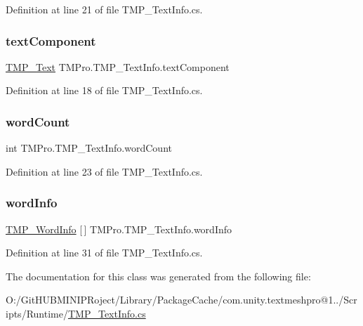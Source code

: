 Definition at line 21 of file T\+M\+P\+\_\+\+Text\+Info.\+cs.

\mbox{\label{class_t_m_pro_1_1_t_m_p___text_info_ab23d67636c516cc8bd985f7e0904d3d9}} 
\subsubsection{\texorpdfstring{textComponent}{textComponent}}
{\footnotesize\ttfamily \mbox{\hyperlink{class_t_m_pro_1_1_t_m_p___text}{T\+M\+P\+\_\+\+Text}} T\+M\+Pro.\+T\+M\+P\+\_\+\+Text\+Info.\+text\+Component}



Definition at line 18 of file T\+M\+P\+\_\+\+Text\+Info.\+cs.

\mbox{\label{class_t_m_pro_1_1_t_m_p___text_info_ac2bb20330e0efa71d8fecd90c783fe65}} 
\subsubsection{\texorpdfstring{wordCount}{wordCount}}
{\footnotesize\ttfamily int T\+M\+Pro.\+T\+M\+P\+\_\+\+Text\+Info.\+word\+Count}



Definition at line 23 of file T\+M\+P\+\_\+\+Text\+Info.\+cs.

\mbox{\label{class_t_m_pro_1_1_t_m_p___text_info_a5d98e3b54820b5c1368b8e9ee8205f5c}} 
\subsubsection{\texorpdfstring{wordInfo}{wordInfo}}
{\footnotesize\ttfamily \mbox{\hyperlink{struct_t_m_pro_1_1_t_m_p___word_info}{T\+M\+P\+\_\+\+Word\+Info}} \mbox{[}$\,$\mbox{]} T\+M\+Pro.\+T\+M\+P\+\_\+\+Text\+Info.\+word\+Info}



Definition at line 31 of file T\+M\+P\+\_\+\+Text\+Info.\+cs.



The documentation for this class was generated from the following file\+:\begin{DoxyCompactItemize}
\item 
O\+:/\+Git\+H\+U\+B\+M\+I\+N\+I\+P\+Roject/\+Library/\+Package\+Cache/com.\+unity.\+textmeshpro@1../\+Scripts/\+Runtime/\mbox{\hyperlink{_t_m_p___text_info_8cs}{T\+M\+P\+\_\+\+Text\+Info.\+cs}}\end{DoxyCompactItemize}
